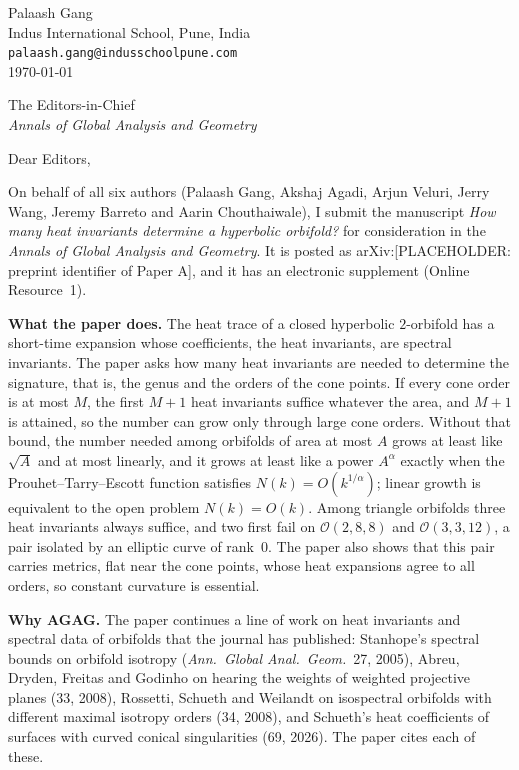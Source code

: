 \documentclass[11pt]{article}
\begin{document}
\begin{flushright}
Palaash Gang\\
Indus International School, Pune, India\\
\texttt{palaash.gang@indusschoolpune.com}\\[6pt]
\today
\end{flushright}

The Editors-in-Chief\\
\emph{Annals of Global Analysis and Geometry}

Dear Editors,

On behalf of all six authors (Palaash Gang, Akshaj Agadi, Arjun Veluri, Jerry Wang, Jeremy Barreto and Aarin Chouthaiwale), I submit the manuscript \emph{How many heat invariants determine a hyperbolic orbifold?} for consideration in the \emph{Annals of Global Analysis and Geometry}. It is posted as arXiv:[PLACEHOLDER: preprint identifier of Paper A], and it has an electronic supplement (Online Resource~1).

\textbf{What the paper does.} The heat trace of a closed hyperbolic $2$-orbifold has a short-time expansion whose coefficients, the heat invariants, are spectral invariants. The paper asks how many heat invariants are needed to determine the signature, that is, the genus and the orders of the cone points. If every cone order is at most $M$, the first $M+1$ heat invariants suffice whatever the area, and $M+1$ is attained, so the number can grow only through large cone orders. Without that bound, the number needed among orbifolds of area at most $A$ grows at least like $\sqrt A$ and at most linearly, and it grows at least like a power $A^\alpha$ exactly when the Prouhet--Tarry--Escott function satisfies $N(k)=O(k^{1/\alpha})$; linear growth is equivalent to the open problem $N(k)=O(k)$. Among triangle orbifolds three heat invariants always suffice, and two first fail on $\mathcal O(2,8,8)$ and $\mathcal O(3,3,12)$, a pair isolated by an elliptic curve of rank~$0$. The paper also shows that this pair carries metrics, flat near the cone points, whose heat expansions agree to all orders, so constant curvature is essential.

\textbf{Why AGAG.} The paper continues a line of work on heat invariants and spectral data of orbifolds that the journal has published: Stanhope's spectral bounds on orbifold isotropy (\emph{Ann.\ Global Anal.\ Geom.}\ 27, 2005), Abreu, Dryden, Freitas and Godinho on hearing the weights of weighted projective planes (33, 2008), Rossetti, Schueth and Weilandt on isospectral orbifolds with different maximal isotropy orders (34, 2008), and Schueth's heat coefficients of surfaces with curved conical singularities (69, 2026). The paper cites each of these.
\end{document}
